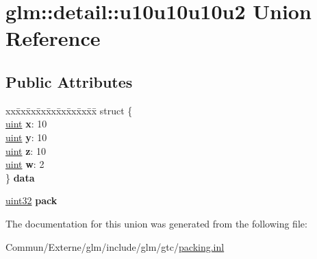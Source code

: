 \hypertarget{unionglm_1_1detail_1_1u10u10u10u2}{}\section{glm\+:\+:detail\+:\+:u10u10u10u2 Union Reference}
\label{unionglm_1_1detail_1_1u10u10u10u2}
\subsection*{Public Attributes}
\begin{DoxyCompactItemize}
\item 
\begin{tabbing}
xx\=xx\=xx\=xx\=xx\=xx\=xx\=xx\=xx\=\kill
struct \{\\
\>\hyperlink{group__core__precision_ga4fd29415871152bfb5abd588334147c8}{uint} {\bfseries x}: 10\\
\>\hyperlink{group__core__precision_ga4fd29415871152bfb5abd588334147c8}{uint} {\bfseries y}: 10\\
\>\hyperlink{group__core__precision_ga4fd29415871152bfb5abd588334147c8}{uint} {\bfseries z}: 10\\
\>\hyperlink{group__core__precision_ga4fd29415871152bfb5abd588334147c8}{uint} {\bfseries w}: 2\\
\} {\bfseries data}\hypertarget{unionglm_1_1detail_1_1u10u10u10u2_a2b1c07bb6d4d674dade5bd7c1e91c791}{}\label{unionglm_1_1detail_1_1u10u10u10u2_a2b1c07bb6d4d674dade5bd7c1e91c791}
\\

\end{tabbing}\item 
\hyperlink{group__gtc__type__precision_ga202b6a53c105fcb7e531f9b443518451}{uint32} {\bfseries pack}\hypertarget{unionglm_1_1detail_1_1u10u10u10u2_a8bb9d7804af09ba3790a4b5622321511}{}\label{unionglm_1_1detail_1_1u10u10u10u2_a8bb9d7804af09ba3790a4b5622321511}

\end{DoxyCompactItemize}


The documentation for this union was generated from the following file\+:\begin{DoxyCompactItemize}
\item 
Commun/\+Externe/glm/include/glm/gtc/\hyperlink{packing_8inl}{packing.\+inl}\end{DoxyCompactItemize}
